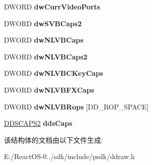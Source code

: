 \begin{DoxyCompactItemize}
D\+W\+O\+RD {\bfseries dw\+Curr\+Video\+Ports}
\item 
\mbox{\label{struct___d_d_c_a_p_s___d_x6_affa0077d3c41d121a4ccdb087e3a4bfb}} 
D\+W\+O\+RD {\bfseries dw\+S\+V\+B\+Caps2}
\item 
\mbox{\label{struct___d_d_c_a_p_s___d_x6_a9467b8858c7641526c642c532031fb34}} 
D\+W\+O\+RD {\bfseries dw\+N\+L\+V\+B\+Caps}
\item 
\mbox{\label{struct___d_d_c_a_p_s___d_x6_ab19041a6f90ffa6d2d8383ed8546be24}} 
D\+W\+O\+RD {\bfseries dw\+N\+L\+V\+B\+Caps2}
\item 
\mbox{\label{struct___d_d_c_a_p_s___d_x6_a41d6cbeb15fe30c866f7f02c4511ad01}} 
D\+W\+O\+RD {\bfseries dw\+N\+L\+V\+B\+C\+Key\+Caps}
\item 
\mbox{\label{struct___d_d_c_a_p_s___d_x6_a232fa4a726c90fb5f3f8b5eb81b55e2c}} 
D\+W\+O\+RD {\bfseries dw\+N\+L\+V\+B\+F\+X\+Caps}
\item 
\mbox{\label{struct___d_d_c_a_p_s___d_x6_ae5d503860899f766837a1adea6c67e42}} 
D\+W\+O\+RD {\bfseries dw\+N\+L\+V\+B\+Rops} \mbox{[}D\+D\+\_\+\+R\+O\+P\+\_\+\+S\+P\+A\+CE\mbox{]}
\item 
\mbox{\label{struct___d_d_c_a_p_s___d_x6_a3f36ca70036e6d6f9ba09715b62513ab}} 
\hyperlink{struct___d_d_s_c_a_p_s2}{D\+D\+S\+C\+A\+P\+S2} {\bfseries dds\+Caps}
\end{DoxyCompactItemize}


该结构体的文档由以下文件生成\+:\begin{DoxyCompactItemize}
\item 
E\+:/\+React\+O\+S-\/0../sdk/include/psdk/ddraw.\+h\end{DoxyCompactItemize}
